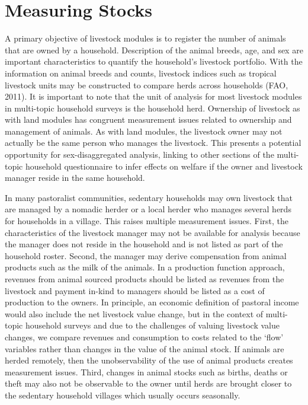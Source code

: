 \documentclass[
]{book}
\begin{document}
\hypertarget{measuring-stocks}{%
\section{Measuring Stocks}\label{measuring-stocks}}

A primary objective of livestock modules is to register the number of animals that are owned by a household. Description of the animal breeds, age, and sex are important characteristics to quantify the household's livestock portfolio. With the information on animal breeds and counts, livestock indices such as tropical livestock units may be constructed to compare herds across households (FAO, 2011). It is important to note that the unit of analysis for most livestock modules in multi-topic household surveys is the household herd. Ownership of livestock as with land modules has congruent measurement issues related to ownership and management of animals. As with land modules, the livestock owner may not actually be the same person who manages the livestock. This presents a potential opportunity for sex-disaggregated analysis, linking to other sections of the multi-topic household questionnaire to infer effects on welfare if the owner and livestock manager reside in the same household.

In many pastoralist communities, sedentary households may own livestock that are managed by a nomadic herder or a local herder who manages several herds for households in a village. This raises multiple measurement issues. First, the characteristics of the livestock manager may not be available for analysis because the manager does not reside in the household and is not listed as part of the household roster. Second, the manager may derive compensation from animal products such as the milk of the animals. In a production function approach, revenues from animal sourced products should be listed as revenues from the livestock and payment in-kind to managers should be listed as a cost of production to the owners. In principle, an economic definition of pastoral income would also include the net livestock value change, but in the context of multi-topic household surveys and due to the challenges of valuing livestock value changes, we compare revenues and consumption to costs related to the `flow' variables rather than changes in the value of the animal stock. If animals are herded remotely, then the unobservability of the use of animal products creates measurement issues. Third, changes in animal stocks such as births, deaths or theft may also not be observable to the owner until herds are brought closer to the sedentary household villages which usually occurs seasonally.
\end{document}
